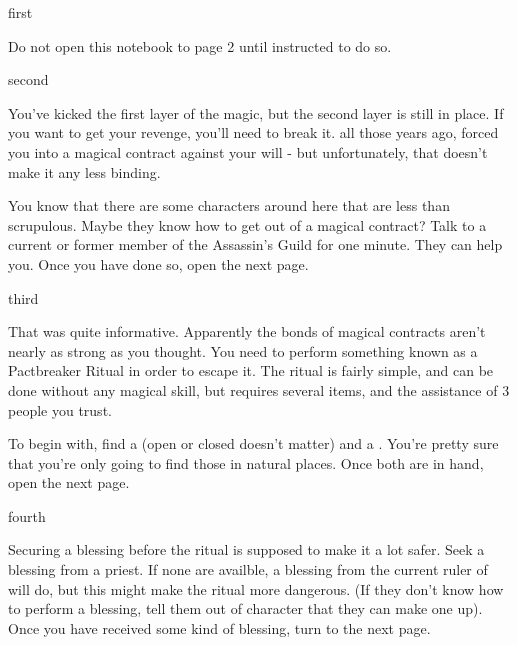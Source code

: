 \documentclass[greennotebook]{NeptuneBall}
\begin{document}

\startnotebook{\nSpellBreakNotebook{}}

\begin{page}{first}

Do not open this notebook to page 2 until instructed to do so.


\end{page}

\begin{page}{second}

You've kicked the first layer of the magic, but the second layer is still in place. If you want to get your revenge, you'll need to break it. all those years ago, \cWitch{} forced you into a magical contract against your will - but unfortunately, that doesn't make it any less binding.

You know that there are some characters around here that are less than scrupulous. Maybe they know how to get out of a magical contract? Talk to a current or former member of the Assassin's Guild for one minute. They can help you. Once you have done so, open the next page.

\end{page}

\begin{page}{third}

That was quite informative. Apparently the bonds of magical contracts aren't nearly as strong as you thought. You need to perform something known as a Pactbreaker Ritual in order to escape it. The ritual is fairly simple, and can be done without any magical skill, but requires several items, and the assistance of 3 people you trust.

To begin with, find a \iClam{} (open or closed doesn't matter) and a \iSeaFan{}. You're pretty sure that you're only going to find those in natural places. Once both are in hand, open the next page.

\end{page}

\begin{page}{fourth}

Securing a blessing before the ritual is supposed to make it a lot safer. Seek a blessing from a priest. If none are availble, a blessing from the current ruler of \pAtlantis{} will do, but this might make the ritual more dangerous. (If they don't know how to perform a blessing, tell them out of character that they can make one up). Once you have received some kind of blessing, turn to the next page.

\end{page}
\end{document}
